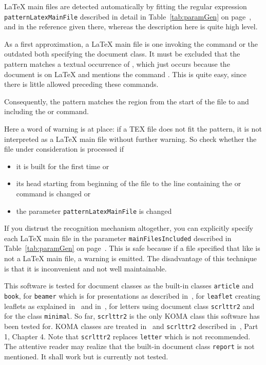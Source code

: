 \LaTeX{} main files are detected automatically 
by fitting the regular expression \texttt{patternLatexMainFile} 
described in detail in Table~\ref{tab:paramGen} on page~\pageref{tab:paramGen}, 
and in the reference given there, 
whereas the description here is quite high level. 

As a first approximation, a \LaTeX{} main file is one invoking 
the command  
or the outdated  both specifying the document class. 
It must be excluded that the pattern matches a textual occurrence of , 
which just occurs because the document is on \LaTeX{} 
and mentions the command . 
This is quite easy, since there is little allowed preceding these commands. 

Consequently, the pattern matches the region from the start of the file 
to and including the  or  command. 

Here a word of warning is at place: if a TEX file does not fit the pattern, 
it is not interpreted as a \LaTeX{} main file without further warning. 
So check whether the file under consideration is processed if 
%
\begin{itemize}
  \item 
  it is built for the first time or 
  \item 
  its head starting from beginning of the file 
  to the line containing the  or  command 
  is changed or
  \item 
  the parameter \texttt{patternLatexMainFile} is changed 
\end{itemize}
%
If you distrust the recognition mechanism altogether, 
you can explicitly specify each \LaTeX{} main file in the parameter \texttt{mainFilesIncluded} 
described in Table~\ref{tab:paramGen} on page~\pageref{tab:paramGen}. 
This is safe because if a file specified that like is not a \LaTeX{} main file, 
a warning is emitted. 
The disadvantage of this technique is that it is inconvenient and not well maintainable. 

This software is tested for document classes 
as the built-in classes \texttt{article} and \texttt{book}, 
for \texttt{beamer} which is for presentations as described in~\cite{Beamer}, 
for \texttt{leaflet} creating leaflets as explained in~\cite{Leaflet} 
and in~\cite{LeafletMan}, 
for letters using document class \texttt{scrlttr2} and for the class \texttt{minimal}. 
So far, \texttt{scrlttr2} is the only KOMA class 
this software has been tested for. 
KOMA classes are treated in~\cite{KomaAnl23} 
and \texttt{scrlttr2} described in~\cite{KomaAnl23}, Part 1, Chapter 4. 
Note that \texttt{scrlttr2} replaces \texttt{letter} which is not recommended. 
The attentive reader may realize 
that the built-in document class \texttt{report} is not mentioned. 
It shall work but is currently not tested. 

